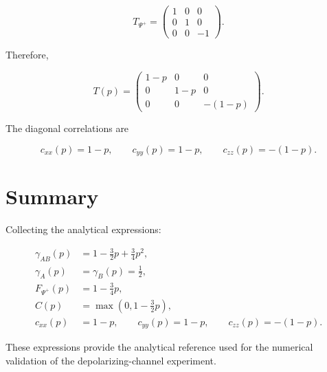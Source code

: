 \[
T_{\Psi^+}
=
\begin{pmatrix}
1 & 0 & 0 \\
0 & 1 & 0 \\
0 & 0 & -1
\end{pmatrix}.
\]

Therefore,

\begin{equation}
T(p)
=
\begin{pmatrix}
1-p & 0 & 0 \\
0 & 1-p & 0 \\
0 & 0 & -(1-p)
\end{pmatrix}.
\label{eq:appendix_depolarizing_tensor}
\end{equation}

The diagonal correlations are

\begin{equation}
c_{xx}(p)
=
1-p,
\qquad
c_{yy}(p)
=
1-p,
\qquad
c_{zz}(p)
=
-(1-p).
\label{eq:appendix_depolarizing_diagonal_correlations}
\end{equation}


\section*{Summary}

Collecting the analytical expressions:

\[
\boxed{
\begin{aligned}
\gamma_{AB}(p)
&=
1-\frac{3}{2}p+\frac{3}{4}p^2,
\\
\gamma_A(p)
&=
\gamma_B(p)
=
\frac{1}{2},
\\
F_{\Psi^+}(p)
&=
1-\frac{3}{4}p,
\\
C(p)
&=
\max
\left(
0,
1-\frac{3}{2}p
\right),
\\
c_{xx}(p)
&=
1-p,
\qquad
c_{yy}(p)
=
1-p,
\qquad
c_{zz}(p)
=
-(1-p).
\end{aligned}
}
\]

These expressions provide the analytical reference used for the numerical validation of the depolarizing-channel experiment.